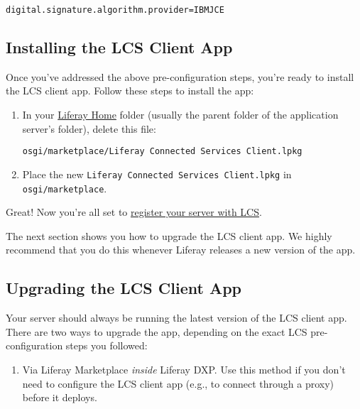 \begin{verbatim}
digital.signature.algorithm.provider=IBMJCE
\end{verbatim}

\subsection{Installing the LCS Client
App}\label{installing-the-lcs-client-app}

Once you've addressed the above pre-configuration steps, you're ready to
install the LCS client app. Follow these steps to install the app:

\begin{enumerate}
\def\labelenumi{\arabic{enumi}.}
\item
  In your
  \href{/docs/7-0/deploy/-/knowledge_base/d/installing-product\#liferay-home}{Liferay
  Home} folder (usually the parent folder of the application server's
  folder), delete this file:

\begin{verbatim}
osgi/marketplace/Liferay Connected Services Client.lpkg
\end{verbatim}
\item
  Place the new \texttt{Liferay\ Connected\ Services\ Client.lpkg} in
  \texttt{osgi/marketplace}.
\end{enumerate}

Great! Now you're all set to
\href{/docs/7-0/deploy/-/knowledge_base/d/registering-your-dxp-server-with-lcs}{register
your server with LCS}.

The next section shows you how to upgrade the LCS client app. We highly
recommend that you do this whenever Liferay releases a new version of
the app.

\subsection{Upgrading the LCS Client
App}\label{upgrading-the-lcs-client-app}

Your server should always be running the latest version of the LCS
client app. There are two ways to upgrade the app, depending on the
exact LCS pre-configuration steps you followed:

\begin{enumerate}
\def\labelenumi{\arabic{enumi}.}
\tightlist
\item
  Via Liferay Marketplace \emph{inside} Liferay DXP. Use this method if
  you don't need to configure the LCS client app (e.g., to connect
  through a proxy) before it deploys.
\end{enumerate}


